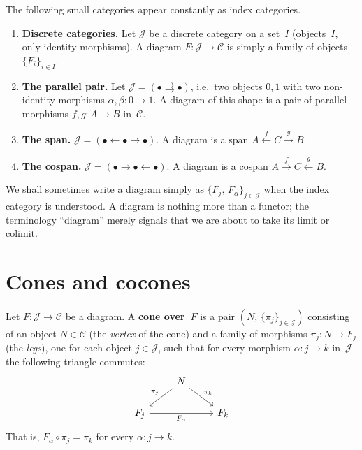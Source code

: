 \begin{example}\label{ex:diagrams-shapes}
The following small categories appear constantly as index categories.
\begin{enumerate}[label=(\roman*)]
\item \textbf{Discrete categories.}
    Let $\mathcal{J}$ be a discrete category on a set~$I$
    (objects~$I$, only identity morphisms).
    A diagram $F\colon \mathcal{J}\to\mathcal{C}$ is simply a family
    of objects $\{F_i\}_{i\in I}$.

\item \textbf{The parallel pair.}
    Let $\mathcal{J} = (\bullet \rightrightarrows \bullet)$,
    i.e.\ two objects $0,1$ with two non-identity morphisms
    $\alpha,\beta\colon 0\to 1$.
    A diagram of this shape is a pair of parallel morphisms
    $f,g\colon A\to B$ in~$\mathcal{C}$.

\item \textbf{The span.}
    $\mathcal{J} = (\bullet \leftarrow \bullet \rightarrow \bullet)$.
    A diagram is a span $A \xleftarrow{f} C \xrightarrow{g} B$.

\item \textbf{The cospan.}
    $\mathcal{J} = (\bullet \rightarrow \bullet \leftarrow \bullet)$.
    A diagram is a cospan $A \xrightarrow{f} C \xleftarrow{g} B$.
\end{enumerate}
\end{example}

\begin{remark}\label{rem:diagram-notation}
We shall sometimes write a diagram simply as
$\{F_j,\,F_\alpha\}_{j\in\mathcal{J}}$
when the index category is understood.
A diagram is nothing more than a functor; the terminology ``diagram''
merely signals that we are about to take its limit or colimit.
\end{remark}


\section{Cones and cocones}\label{sec:cones}

\begin{definition}[Cone]\label{def:cone}
Let $F\colon \mathcal{J}\to\mathcal{C}$ be a diagram.
A \textbf{cone over~$F$} is a pair $(N,\,\{\pi_j\}_{j\in\mathcal{J}})$
consisting of an object $N\in\mathcal{C}$ (the \emph{vertex} of the cone)
and a family of morphisms $\pi_j\colon N\to F_j$ (the \emph{legs}),
one for each object $j\in\mathcal{J}$,
such that for every morphism $\alpha\colon j\to k$ in~$\mathcal{J}$
the following triangle commutes:
\[
\begin{tikzcd}
& N \arrow[dl, "\pi_j"'] \arrow[dr, "\pi_k"] & \\
F_j \arrow[rr, "F_\alpha"'] & & F_k
\end{tikzcd}
\]
That is, $F_\alpha \circ \pi_j = \pi_k$ for every $\alpha\colon j\to k$.
\end{definition}

